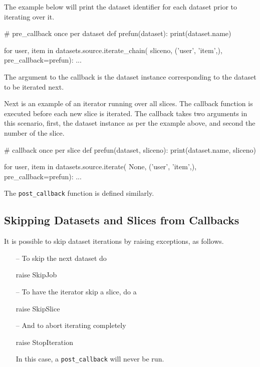 The example below will print the dataset identifier for each dataset
prior to iterating over it.
\begin{python}
# pre_callback once per dataset
def prefun(dataset):
    print(dataset.name)

for user, item in datasets.source.iterate_chain(
                       sliceno, ('user', 'item',),
                       pre_callback=prefun):
    ...
\end{python}
The argument to the callback is the dataset instance corresponding to
the dataset to be iterated next.

Next is an example of an iterator running over all slices.  The
callback function is executed before each new slice is iterated.  The
callback takes two arguments in this scenario, first, the dataset
instance as per the example above, and second the number of the slice.
\begin{python}
# callback once per slice
def prefun(dataset, sliceno):
    print(dataset.name, sliceno)

for user, item in datasets.source.iterate(
                       None, ('user', 'item',),
                       pre_callback=prefun):
    ...
\end{python}
The \texttt{post\_callback} function is defined similarly.


\subsection{Skipping Datasets and Slices from Callbacks}
It is possible to skip dataset iterations by raising exceptions, as
follows.
\begin{itemize}
\item [--] To skip the next dataset do
\begin{python}
raise SkipJob
\end{python}

\item [--]  To have the iterator skip a slice, do a
\begin{python}
raise SkipSlice
\end{python}

\item [--] And to abort iterating completely
\begin{python}
raise StopIteration
\end{python}
In this case, a \texttt{post\_callback} will never be run.
\end{itemize}



